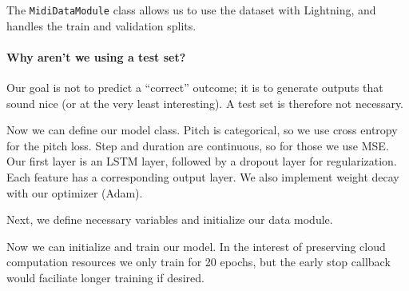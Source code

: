 \documentclass{article}
\begin{document}


The \lstinline{MidiDataModule} class allows us to use the dataset with Lightning, and handles the train and validation splits.

\paragraph{Why aren't we using a test set?} Our goal is not to predict a ``correct'' outcome; it is to generate outputs that sound nice (or at the very least interesting). A test set is therefore not necessary. 



Now we can define our model class. Pitch is categorical, so we use cross entropy for the pitch loss. Step and duration are continuous, so for those we  use MSE. Our first layer is an LSTM layer, followed by a dropout layer for regularization. Each feature has a corresponding output layer.  We also implement weight decay with our optimizer (Adam). 



Next, we define necessary variables and initialize our data module.



Now we can initialize and train our model. In the interest of preserving cloud computation resources we only train for 20 epochs, but the early stop callback would faciliate longer training if desired.


\end{document}
